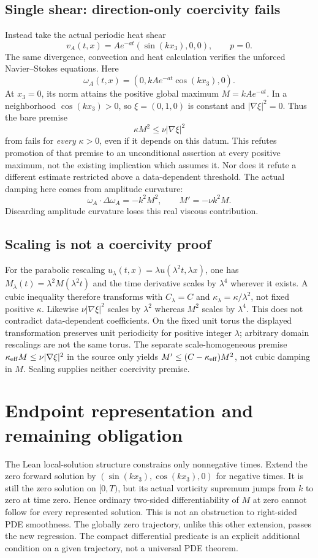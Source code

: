 \documentclass[11pt]{article}
\newcommand{\lean}[1]{{\upshape\path{#1}}}
\begin{document}
\subsection{Single shear: direction-only coercivity fails}\label{sec:shear}
Instead take the actual periodic heat shear
\[
 v_A(t,x)=Ae^{-at}(\sin(kx_3),0,0),\qquad p=0.
\]
The same divergence, convection and heat calculation verifies the unforced
Navier--Stokes equations. Here
\[
 \omega_A(t,x)=(0,kAe^{-at}\cos(kx_3),0).
\]
At $x_3=0$, its norm attains the positive global maximum $M=kAe^{-at}$.
In a neighborhood $\cos(kx_3)>0$, so $\xi=(0,1,0)$ is constant and
$|\nabla\xi|^2=0$. Thus the bare premise
\[
 \kappa M^2\leq\nu|\nabla\xi|^2
\]
from \lean{viscous_direction_dissipation_bridge} fails for \emph{every}
$\kappa>0$, even if it depends on this datum. This refutes promotion of that
premise to an unconditional assertion at every positive maximum, not the
existing implication which assumes it. Nor does it refute a different estimate
restricted above a data-dependent threshold. The actual damping here comes from
amplitude curvature:
\[
 \omega_A\cdot\Delta\omega_A=-k^2M^2,\qquad M'=-\nu k^2M.
\]
Discarding amplitude curvature loses this real viscous contribution.

\subsection{Scaling is not a coercivity proof}
For the parabolic rescaling $u_\lambda(t,x)=\lambda u(\lambda^2t,\lambda x)$,
one has $M_\lambda(t)=\lambda^2M(\lambda^2t)$ and the time derivative scales
by $\lambda^4$ wherever it exists. A cubic inequality therefore transforms with
$C_\lambda=C$ and $\kappa_\lambda=\kappa/\lambda^2$, not fixed positive
$\kappa$. Likewise $\nu|\nabla\xi|^2$ scales by $\lambda^2$ whereas $M^2$ scales
by $\lambda^4$. This does not contradict data-dependent coefficients. On the
fixed unit torus the displayed transformation preserves unit periodicity for
positive integer $\lambda$; arbitrary domain rescalings are not the same torus.
The separate scale-homogeneous premise $\kappa_{\rm eff}M\leq\nu|\nabla\xi|^2$
in the source only yields $M'\leq(C-\kappa_{\rm eff})M^2$, not cubic damping
in $M$. Scaling supplies neither coercivity premise.

\section{Endpoint representation and remaining obligation}
The Lean local-solution structure constrains only nonnegative times. Extend the
zero forward solution by $(\sin(kx_3),\cos(kx_3),0)$ for negative times. It is
still the zero solution on $[0,T)$, but its actual vorticity supremum jumps from
$k$ to zero at time zero. Hence ordinary two-sided differentiability of $M$ at
zero cannot follow for every represented solution. This is not an obstruction to
right-sided PDE smoothness. The globally zero trajectory, unlike this other
extension, passes the new regression. The compact differential predicate is an
explicit additional condition on a given trajectory, not a universal PDE theorem.
\end{document}
